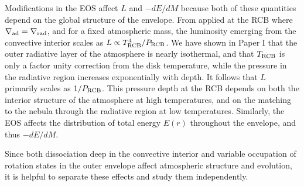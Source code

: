 Modifications in the EOS affect $L$ and $-dE/dM$ because both of these quantities depend on the global structure of the envelope. From  applied at the RCB where $\nabla_{\rm ad}=\nabla_{\rm rad}$, and for a fixed atmospheric mass, the luminosity emerging from the convective interior scales as $L \propto T_{\rm RCB}^4/P_{\rm RCB}$. We have shown in Paper I that the outer radiative layer of the atmosphere is nearly isothermal, and that $T_{\rm RCB}$ is only a factor unity correction from the disk temperature, while the pressure in the radiative region increases exponentially with depth. It follows that $L$ primarily scales as $1/P_{\rm RCB}$. This pressure depth at the RCB depends on both the interior structure of the atmosphere at high temperatures, and on the matching to the nebula through the radiative region at low temperatures. Similarly, the EOS affects the distribution of total energy $E(r)$ throughout the envelope, and thus $-dE/dM$.

Since both dissociation deep in the convective interior and variable occupation of rotation states in the outer envelope affect atmospheric structure and evolution, it is helpful to separate these effects and study them independently. 

%
%
%
%
%
%



